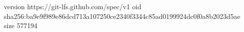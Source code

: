 version https://git-lfs.github.com/spec/v1
oid sha256:ba9e9f989e86dcd713a107250ce2340f3344c85ad0199924dc0f0a8b2023d5ae
size 577194
